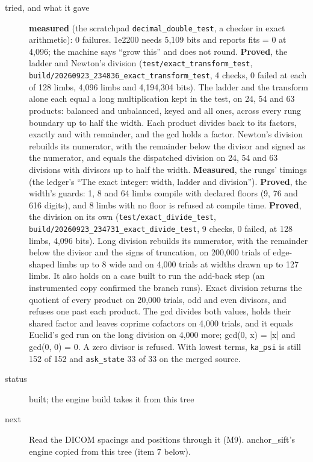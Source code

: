 \begin{description}
\item[{tried, and what it gave}] \textbf{measured} (the scratchpad \texttt{decimal\_\allowbreak{}double\_\allowbreak{}test}, a checker in exact arithmetic): 0 failures. 1e2200 needs 5,109 bits and reports fits = 0 at 4,096; the machine says “grow this” and does not round. \textbf{Proved}, the ladder and Newton's division (\texttt{test/\allowbreak{}exact\_\allowbreak{}transform\_\allowbreak{}test}, \texttt{build/\allowbreak{}20260923\_\allowbreak{}234836\_\allowbreak{}exact\_\allowbreak{}transform\_\allowbreak{}test}, 4 checks, 0 failed at each of 128 limbs, 4,096 limbs and 4,194,304 bits). The ladder and the transform alone each equal a long multiplication kept in the test, on 24, 54 and 63 products: balanced and unbalanced, keyed and all ones, across every rung boundary up to half the width. Each product divides back to its factors, exactly and with remainder, and the gcd holds a factor. Newton's division rebuilds its numerator, with the remainder below the divisor and signed as the numerator, and equals the dispatched division on 24, 54 and 63 divisions with divisors up to half the width. \textbf{Measured}, the rungs' timings (the ledger's “The exact integer: width, ladder and division”). \textbf{Proved}, the width's guards: 1, 8 and 64 limbs compile with declared floors (9, 76 and 616 digits), and 8 limbs with no floor is refused at compile time. \textbf{Proved}, the division on its own (\texttt{test/\allowbreak{}exact\_\allowbreak{}divide\_\allowbreak{}test}, \texttt{build/\allowbreak{}20260923\_\allowbreak{}234731\_\allowbreak{}exact\_\allowbreak{}divide\_\allowbreak{}test}, 9 checks, 0 failed, at 128 limbs, 4,096 bits). Long division rebuilds its numerator, with the remainder below the divisor and the signs of truncation, on 200,000 trials of edge-shaped limbs up to 8 wide and on 4,000 trials at widths drawn up to 127 limbs. It also holds on a case built to run the add-back step (an instrumented copy confirmed the branch runs). Exact division returns the quotient of every product on 20,000 trials, odd and even divisors, and refuses one past each product. The gcd divides both values, holds their shared factor and leaves coprime cofactors on 4,000 trials, and it equals Euclid's gcd run on the long division on 4,000 more; gcd(0, x) = |x| and gcd(0, 0) = 0. A zero divisor is refused. With lowest terms, \texttt{ka\_\allowbreak{}psi} is still 152 of 152 and \texttt{ask\_\allowbreak{}state} 33 of 33 on the merged source.
\item[{status}] built; the engine build takes it from this tree
\item[{next}] Read the DICOM spacings and positions through it (M9). anchor\_\allowbreak{}sift's engine copied from this tree (item 7 below).
\end{description}

